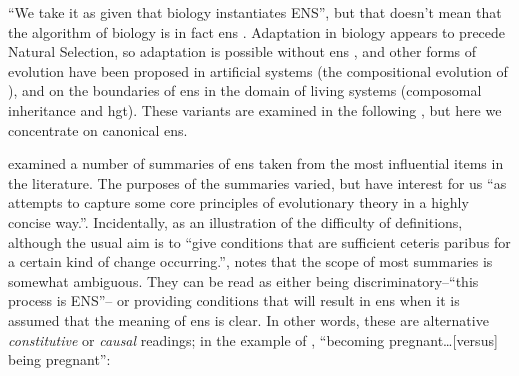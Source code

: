 ``We take it as given that biology instantiates ENS'', but that doesn't mean that the algorithm of biology is in fact \gls{ens} \parencite{Watson2012}. Adaptation in biology appears to precede Natural Selection, so adaptation is possible without \gls{ens} \cite{Watson2010}, and other forms of evolution have been proposed in artificial systems (\eg the compositional evolution of \cite{Arthur2009}), and on the boundaries of \gls{ens} in the domain of living systems (\eg composomal inheritance and \gls{hgt}). These variants are examined in the following , but here we concentrate on canonical \gls{ens}.

\cite{Godfrey-Smith2007} examined a number of summaries of \gls{ens} taken from the most influential items in the literature. The purposes of the summaries varied, but have interest for us ``as attempts to capture some core principles of evolutionary theory in a highly concise way.''. Incidentally, as an illustration of the difficulty of definitions, although the usual aim is to ``give conditions that are sufficient ceteris paribus for a certain kind of change occurring.'', \cite{Godfrey-Smith2007} notes that the scope of most summaries is somewhat ambiguous. They can be read as either being discriminatory--``this process is ENS''-- or providing conditions that will result in \gls{ens} when it is assumed that the meaning of \gls{ens} is clear. In other words, these are alternative \emph{constitutive} or \emph{causal} readings; in the example of \cite{Godfrey-Smith2007}, ``becoming pregnant\ldots{}{[}versus{]} being pregnant'':

